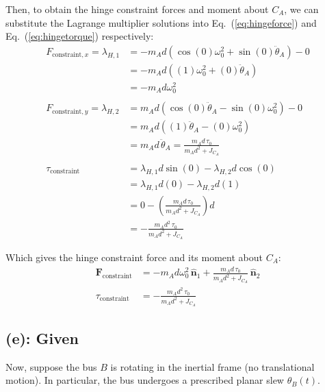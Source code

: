 \documentclass[titlepage]{article}
\begin{document}
\newpage

Then, to obtain the hinge constraint forces and moment about $C_A$, we can substitute the Lagrange multiplier solutions into Eq.~(\ref{eq:hingeforce}) and Eq.~(\ref{eq:hingetorque}) respectively:
\begin{equation}
	\begin{split}
		F_{\text{constraint},x}=\lambda_{H,1}&=-m_Ad\left(\cos(0)\omega_0^2+\sin(0)\ddot{\theta}_A\right)-0 \\
		&=-m_Ad\left((1)\omega_0^2+(0)\ddot{\theta}_A\right) \\
		&=-m_Ad\omega_0^2 \\
		\\
		F_{\text{constraint},y}=\lambda_{H,2}&=m_Ad\left(\cos(0)\ddot{\theta}_A-\sin(0)\omega_0^2\right)-0 \\
		&=m_Ad\left((1)\ddot{\theta}_A-(0)\omega_0^2\right) \\
		&=m_Ad\,\ddot{\theta}_A=\frac{m_Ad\,\tau_0}{m_Ad^2+J_{C_A}} \\
		\\
		\tau_{\text{constraint}}&=\lambda_{H,1}d\sin(0)-\lambda_{H,2}d\cos(0) \\
		&=\lambda_{H,1}d(0)-\lambda_{H,2}d(1) \\
		&=0-\left(\frac{m_Ad\,\tau_0}{m_Ad^2+J_{C_A}}\right)d \\
		&=-\frac{m_Ad^2\,\tau_0}{m_Ad^2+J_{C_A}}
	\end{split}
\end{equation}

\begin{mdframed}[linewidth=1pt, innertopmargin=10pt, innerbottommargin=10pt]
	Which gives the hinge constraint force and its moment about $C_A$:
	\begin{equation}
		\begin{split}
			\boldsymbol{F}_{\text{constraint}}&=-m_Ad\omega_0^2\,\hat{\boldsymbol{n}}_1+\frac{m_Ad\,\tau_0}{m_Ad^2+J_{C_A}}\,\hat{\boldsymbol{n}}_2 \\
			\tau_{\text{constraint}}&=-\frac{m_Ad^2\,\tau_0}{m_Ad^2+J_{C_A}}
		\end{split}
	\end{equation}
\end{mdframed}

\newpage

\subsection*{(e): Given}
Now, suppose the bus $B$ is rotating in the inertial frame (no translational motion). In particular, the bus undergoes a prescribed planar slew $\theta_B(t)$.
\end{document}
